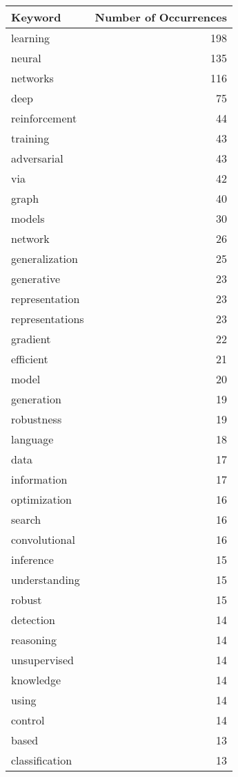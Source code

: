 \begin{table}[h]
\centering
\begin{tabular}{|l|r|}
\hline
Keyword & Number of Occurrences \\
\hline
learning & 198 \\
\hline
neural & 135 \\
\hline
networks & 116 \\
\hline
deep & 75 \\
\hline
reinforcement & 44 \\
\hline
training & 43 \\
\hline
adversarial & 43 \\
\hline
via & 42 \\
\hline
graph & 40 \\
\hline
models & 30 \\
\hline
network & 26 \\
\hline
generalization & 25 \\
\hline
generative & 23 \\
\hline
representation & 23 \\
\hline
representations & 23 \\
\hline
gradient & 22 \\
\hline
efficient & 21 \\
\hline
model & 20 \\
\hline
generation & 19 \\
\hline
robustness & 19 \\
\hline
language & 18 \\
\hline
data & 17 \\
\hline
information & 17 \\
\hline
optimization & 16 \\
\hline
search & 16 \\
\hline
convolutional & 16 \\
\hline
inference & 15 \\
\hline
understanding & 15 \\
\hline
robust & 15 \\
\hline
detection & 14 \\
\hline
reasoning & 14 \\
\hline
unsupervised & 14 \\
\hline
knowledge & 14 \\
\hline
using & 14 \\
\hline
control & 14 \\
\hline
based & 13 \\
\hline
classification & 13 \\

\end{tabular}
\end{table}
